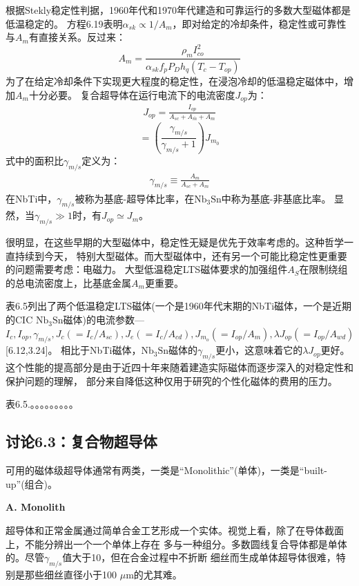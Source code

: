 根据Stekly稳定性判据，1960年代和1970年代建造和可靠运行的多数大型磁体都是低温稳定的。
方程6.19表明$\alpha_{sk}\propto 1/A_m$，即对给定的冷却条件，稳定性或可靠性与$A_m$有直接关系。反过来：
\begin{equation}%
A_m=\frac {\rho_mI_{co}^2}{\alpha_{sk}f_pP_Dh_q(T_c-T_{op})}
\end{equation}
为了在给定冷却条件下实现更大程度的稳定性，在浸泡冷却的低温稳定磁体中，增加$A_m$十分必要。
复合超导体在运行电流下的电流密度$J_{op}$为：
\begin{align*}%
J_{op}=\frac{I_{op}}{A_{sc}+A_ {\bar{m}}+A_m}\tag{6.6}
\end{align*}
\begin{equation}%
=(\frac{\gamma_{m/s}}{\gamma_{m/s}+1})J_{m_0}
\end{equation}
式中的面积比$\gamma_{m/s}$定义为：
\begin{align*}%
\gamma_{m/s}\equiv \frac{A_m}{A_{sc}+A_m}
\end{align*}
在NbTi中，$\gamma_{m/s}$被称为基底-超导体比率，在$\mathrm{Nb_3Sn}$中称为基底-非基底比率。
显然，当$\gamma_{m/s}\gg 1$时，有$J_{op}\simeq J_m$。

很明显，在这些早期的大型磁体中，稳定性无疑是优先于效率考虑的。这种哲学一直持续到今天，
特别大型磁体。而大型磁体中，还有另一个可能比稳定性更重要的问题需要考虑：电磁力。
大型低温稳定LTS磁体要求的加强组件$A_S$在限制绕组的总电流密度上，比基底金属$A_m$更重要。

表6.5列出了两个低温稳定LTS磁体(一个是1960年代末期的NbTi磁体，一个是近期的CIC $\mathrm{Nb_3Sn}$磁体)的电流参数---$I_c,I_{op},\gamma_{m/s},J_c(=I_c/A_{sc}),J_e(=I_c/A_{cd}),
J_{m_o}(=I_{op}/A_m),\lambda J_{op}(=I_{op}/A_{wd})$[6.12,3.24]。
相比于NbTi磁体，$\mathrm{Nb_3Sn}$磁体的$\gamma_{m/s}$更小，这意味着它的$\lambda J_{op}$更好。
这个性能的提高部分是由于近四十年来随着建造实际磁体而逐步深入的对稳定性和保护问题的理解，
部分来自降低这种仅用于研究的个性化磁体的费用的压力。

表6.5.。。。。。。。。。

\subsection{讨论6.3：复合物超导体}
可用的磁体级超导体通常有两类，一类是“Monolithic”(单体)，一类是“built-up”(组合)。

\textbf{A. Monolith}

超导体和正常金属通过简单合金工艺形成一个实体。视觉上看，除了在导体截面上，不能分辨出一个一个单体上存在
多与一种组分。多数圆线复合导体都是单体的。尽管$\gamma_{m/s}$值大于10，但在合金过程中不折断
细丝而生成单体超导体很难，特别是那些细丝直径小于100 $\mu$m的尤其难。


